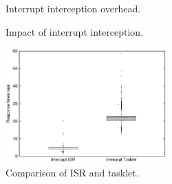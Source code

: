 \begin{figure}[!t]
\begin{minipage}[t]{0.33\hsize}
\begin{center}
\end{center}
\vspace{-3mm}
\caption{\small{Interrupt interception overhead. \newline \,}}
\vspace{-3mm}
\label{fig:irq_overhead}
\end{minipage}
\begin{minipage}[t]{0.33\hsize}
\begin{center}
\end{center}
\vspace{-4mm}
\caption{\small{Impact of interrupt interception.}}
\vspace{-3mm}
\label{fig:response}
\end{minipage}
\begin{minipage}[t]{0.33\hsize}
\begin{center}
\includegraphics[width=62mm]{img/tasklet_vs_interrupt}
\end{center}
\vspace{-5mm}
\caption{\small{Comparison of ISR and tasklet.}}

\label{fig:bottomvstasklet}
\end{minipage}
\end{figure}

